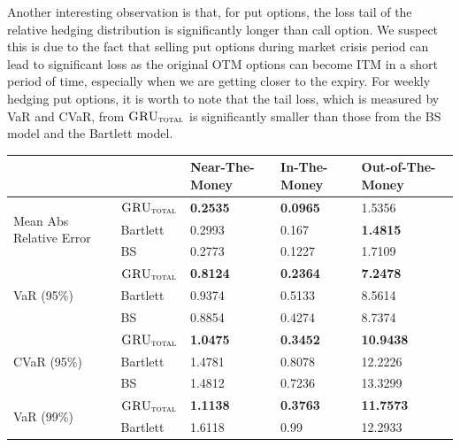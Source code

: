 \documentclass[letterpaper,12pt,titlepage,oneside,final]{book}
\numberwithin{equation}{section}
\theoremstyle{definition}
\newcommand{\modelT}{\textsc{GRU}_{\textsc{total}}}
\begin{document}
Another interesting observation is that, for put options, the loss tail of the relative hedging distribution is significantly longer than call option. We suspect this is due to the fact that selling put options during market crisis period can lead to significant loss as the original OTM options can become ITM in a short period of time, especially when we are getting closer to the expiry. For weekly hedging put options,  it is worth to note that  the tail loss, which is measured by VaR and CVaR, from  $\modelT$ is significantly  smaller than those from the BS model and the Bartlett model. 
\begin{table}[htp!]
	\centering
	\begin{tabular}{ll|l|l|l|}
		\cline{3-5}
		&          & Near-The-Money   & In-The-Money     & Out-of-The-Money  \\ \hline
		\multicolumn{1}{|l|}{\multirow{3}{*}{Mean Abs Relative Error}} & $\modelT$    & \textbf{0.2535}           & \textbf{0.0965}  & 1.5356   \\ 
		\multicolumn{1}{|l|}{}                                & Bartlett     & 0.2993 			& 0.167  		   & \textbf{1.4815}       \\ 
		\multicolumn{1}{|l|}{}                                & BS       	 & 0.2773 		    & 0.1227 		   & 1.7109            \\ 
		\hline
		\multicolumn{1}{|l|}{\multirow{3}{*}{VaR (95\%)}}     & $\modelT$    & \textbf{0.8124} & \textbf{0.2364} & \textbf{7.2478}  \\ 
		\multicolumn{1}{|l|}{}                                & Bartlett 	 & 0.9374 			& 0.5133 		   &8.5614           \\  
		\multicolumn{1}{|l|}{}                                & BS       	 & 0.8854 			& 0.4274 		   &8.7374           \\ 
		\hline
		\multicolumn{1}{|l|}{\multirow{3}{*}{CVaR (95\%)}}    & $\modelT$    & \textbf{1.0475} & \textbf{0.3452} & \textbf{10.9438} \\ 
		\multicolumn{1}{|l|}{}                                & Bartlett 	 & 1.4781  		&0.8078 		   &12.2226          \\  
		\multicolumn{1}{|l|}{}                                & BS       	 &  1.4812  		&0.7236 		   &13.3299          \\ 
		\hline
		\multicolumn{1}{|l|}{\multirow{3}{*}{VaR (99\%)}}     & $\modelT$    & \textbf{1.1138} & \textbf{0.3763} & \textbf{11.7573} \\  
		\multicolumn{1}{|l|}{}                                & Bartlett 	 & 1.6118  		 &0.99   		   &12.2933         \\  

\end{tabular}
\end{table}
\end{document}
